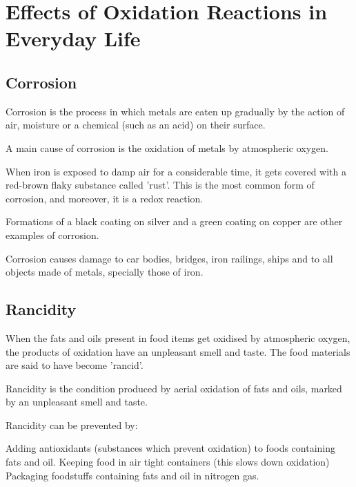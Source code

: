 \section{Effects of Oxidation Reactions in Everyday Life}

\subsection{Corrosion}

\begin{outline}
    \1 Corrosion is the process in which metals are eaten up gradually by the action of air, moisture or a chemical (such as an acid) on their surface.

    \1 A main cause of corrosion is the oxidation of metals by atmospheric oxygen. 

    \1 When iron is exposed to damp air for a considerable time, it gets covered with a red-brown flaky substance called 'rust'. This is the most common form of corrosion, and moreover, it is a redox reaction.

    \1 Formations of a black coating on silver and a green coating on copper are other examples of corrosion.

    \1 Corrosion causes damage to car bodies, bridges, iron railings, ships and to all objects made of metals, specially those of iron.
\end{outline}

\subsection{Rancidity}

\begin{outline}
    \1 When the fats and oils present in food items get oxidised by atmospheric oxygen, the products of oxidation have an unpleasant smell and taste. The food materials are said to have become 'rancid'.

    \1 Rancidity is the condition produced by aerial oxidation of fats and oils, marked by an unpleasant smell and taste.

    \1 Rancidity can be prevented by:

    \2 Adding antioxidants (substances which prevent oxidation) to foods containing fats and oil.
    \2 Keeping food in air tight containers (this slows down oxidation)
    \2 Packaging foodstuffs containing fats and oil in nitrogen gas.
\end{outline}
